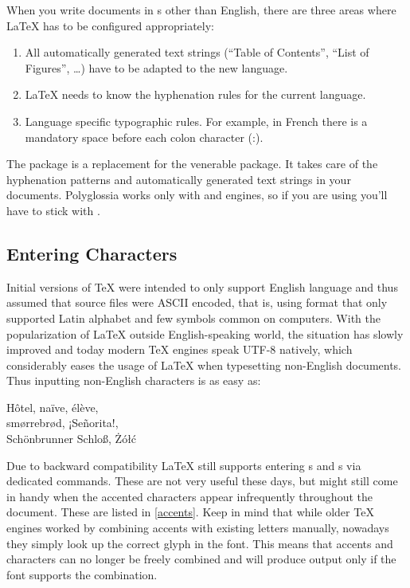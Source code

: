 When you write documents in s other than English, there are three
areas where \LaTeX{} has to be configured appropriately:

\begin{enumerate}
  \item All automatically generated text strings (\enquote{Table of Contents},
        \enquote{List of Figures}, \ldots) have to be adapted to the new language.
  \item \LaTeX{} needs to know the hyphenation rules for the current language.
  \item Language specific typographic rules. For example, in French there is a
        mandatory space before each colon character (:).
\end{enumerate}

The package  is a replacement for the venerable 
package. It takes care of the hyphenation patterns and automatically generated
text strings in your documents. Polyglossia works only with 
and  engines, so if you are using  you'll have to
stick with .

\subsection{Entering Characters}

Initial versions of \TeX{} were intended to only support English language and
thus assumed that source files were ASCII encoded, that is, using format that
only supported Latin alphabet and few symbols common on computers. With the
popularization of \LaTeX{} outside English-speaking world, the situation has
slowly improved and today modern \TeX{} engines speak UTF-8 natively, which
considerably eases the usage of \LaTeX{} when typesetting non-English
documents. Thus inputting non-English characters is as easy as:
\begin{chktexignore}  
\begin{example}
  Hôtel, naïve, élève, \\
  smørrebrød, ¡Señorita!, \\
  Schönbrunner Schloß, Żółć
\end{example}
\end{chktexignore}

Due to backward compatibility \LaTeX{} still supports entering s and
s via dedicated commands. These are not very useful these
days, but might still come in handy when the accented characters appear
infrequently throughout the document. These are listed in \autoref{accents}.
Keep in mind that while older \TeX{} engines worked by combining accents with
existing letters manually, nowadays they simply look up the correct glyph in
the font. This means that accents and characters can no longer be freely
combined and will produce output only if the font supports the combination.

